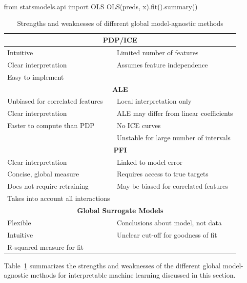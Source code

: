 \begin{samepage}
\begin{pythoncode}
from statsmodels.api import OLS
OLS(preds, x).fit().summary()
\end{pythoncode}
\end{samepage}

\begin{table}
\centering
\renewcommand{\arraystretch}{1.1}
\begin{tabular}{l|l} \hline
\multicolumn{2}{c}{\textbf{PDP/ICE}} \\ \hline
Intuitive & Limited number of features \\
Clear interpretation & Assumes feature independence \\
Easy to implement & \\ \hline
\multicolumn{2}{c}{\textbf{ALE}} \\ \hline
Unbiased for correlated features & Local interpretation only\\
Clear interpretation & ALE may differ from linear coefficients\\ 
Faster to compute than PDP & No ICE curves \\
& Unstable for large number of intervals \\  \hline
\multicolumn{2}{c}{\textbf{PFI}} \\ \hline
Clear interpretation & Linked to model error \\
Concise, global measure & Requires access to true targets \\
Does not require retraining & May be biased for correlated features \\
Takes into account all interactions & \\ \hline
\multicolumn{2}{c}{\textbf{Global Surrogate Models}} \\ \hline
Flexible & Conclusions about model, not data \\ 
Intuitive & Unclear cut-off for goodness of fit \\
R-squared measure for fit & \\ \hline
\end{tabular}
\caption[Strengths and weaknesses of global model-agnostic methods]{Strengths and weaknesses of different global model-agnostic methods}
\label{tab:summaryglobalmethods}
\end{table}

Table~\ref{tab:summaryglobalmethods} summarizes the strengths and weaknesses of the different global model-agnostic methods for interpretable machine learning discussed in this section.


